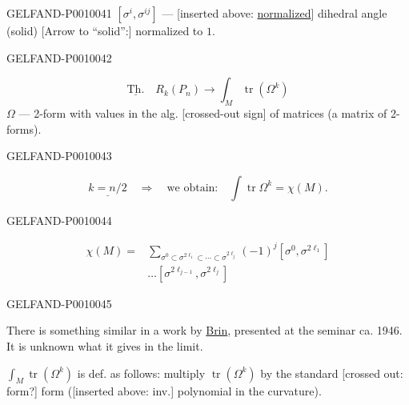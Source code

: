 \begin{GelfandAdjacentEvidence}{GELFAND-P001004}{1}
$[\sigma^i,\sigma^{ij}]$ --- [inserted above: \underline{normalized}] dihedral angle (solid)
[Arrow to “solid”:] normalized to $1$.
\end{GelfandAdjacentEvidence}
\begin{GelfandAdjacentEvidence}{GELFAND-P001004}{2}


\begin{equation*}
\underline{\text{Th.}}\quad R_k(P_n)\longrightarrow\int_M\operatorname{tr}(\Omega^k) \tag{19}
\end{equation*}
$\Omega$ --- 2-form with values in the alg. [crossed-out sign] of matrices (a matrix of 2-forms).
\end{GelfandAdjacentEvidence}
\begin{GelfandAdjacentEvidence}{GELFAND-P001004}{3}

\begin{equation*}
\underline{k=n/2}\quad\Rightarrow\quad\text{we obtain:}\quad\int\operatorname{tr}\Omega^k=\chi(M).
\end{equation*}
\end{GelfandAdjacentEvidence}
\begin{GelfandAdjacentEvidence}{GELFAND-P001004}{4}

\begin{equation*}
\begin{aligned}
\chi(M)={}&\sum_{\sigma^0\subset\sigma^{2\ell_1}\subset\cdots\subset\sigma^{2\ell_j}}
(-1)^j[\sigma^0,\sigma^{2\ell_1}]\\
&\ldots[\sigma^{2\ell_{j-1}},\sigma^{2\ell_j}]
\end{aligned}\tag{20}
\end{equation*}
\end{GelfandAdjacentEvidence}
\begin{GelfandAdjacentEvidence}{GELFAND-P001004}{5}

There is something similar in a work by \underline{Brin}, presented at the seminar ca. 1946. It is unknown what it gives in the limit.

$\displaystyle\int_M\operatorname{tr}(\Omega^k)$ is def. as follows: multiply $\operatorname{tr}(\Omega^k)$ by the standard [crossed out: form?] form ([inserted above: inv.] polynomial in the curvature).
\end{GelfandAdjacentEvidence}
